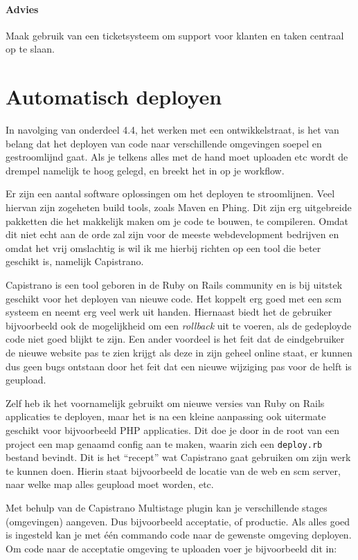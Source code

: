 \paragraph{Advies} Maak gebruik van een ticketsysteem om support voor klanten en taken centraal op te slaan. 

\section{Automatisch deployen}

In navolging van onderdeel 4.4, het werken met een ontwikkelstraat, is het van belang dat het deployen van code naar verschillende omgevingen soepel en gestroomlijnd gaat. Als je telkens alles met de hand moet uploaden etc wordt de drempel namelijk te hoog gelegd, en breekt het in op je workflow.

Er zijn een aantal software oplossingen om het deployen te stroomlijnen. Veel hiervan zijn zogeheten build tools, zoals Maven\cite{maven} en Phing\cite{phing}. Dit zijn erg uitgebreide pakketten die het makkelijk maken om je code te bouwen, te compileren. Omdat dit niet echt aan de orde zal zijn voor de meeste webdevelopment bedrijven en omdat het vrij omslachtig is wil ik me hierbij richten op een tool die beter geschikt is, namelijk Capistrano\cite{capistrano}.

Capistrano is een tool geboren in de Ruby on Rails community en is bij uitstek geschikt voor het deployen van nieuwe code. Het koppelt erg goed met een {\sc scm} systeem en neemt erg veel werk uit handen. Hiernaast biedt het de gebruiker bijvoorbeeld ook de mogelijkheid om een \emph{rollback} uit te voeren, als de gedeployde code niet goed blijkt te zijn. Een ander voordeel is het feit dat de eindgebruiker de nieuwe website pas te zien krijgt als deze in zijn geheel online staat, er kunnen dus geen bugs ontstaan door het feit dat een nieuwe wijziging pas voor de helft is geupload.

Zelf heb ik het voornamelijk gebruikt om nieuwe versies van Ruby on Rails applicaties te deployen, maar het is na een kleine aanpassing ook uitermate geschikt voor bijvoorbeeld PHP applicaties. Dit doe je door in de root van een project een map genaamd config aan te maken, waarin zich een \texttt{deploy.rb} bestand bevindt. Dit is het ``recept'' wat Capistrano gaat gebruiken om zijn werk te kunnen doen. Hierin staat bijvoorbeeld de locatie van de web en {\sc scm} server, naar welke map alles geupload moet worden, etc.

Met behulp van de Capistrano Multistage plugin\cite{capistranomultistage} kan je verschillende stages (omgevingen) aangeven. Dus bijvoorbeeld acceptatie, of productie. Als alles goed is ingesteld kan je met één commando code naar de gewenste omgeving deployen. Om code naar de acceptatie omgeving te uploaden voer je bijvoorbeeld dit in:

